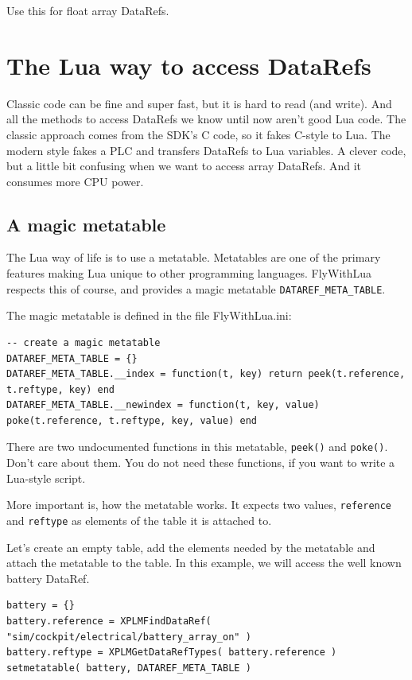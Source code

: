 \documentclass[11pt,parskip=half,a4paper]{scrartcl}
\begin{document}
Use this for float array DataRefs.


\section{The Lua way to access DataRefs}

Classic code can be fine and super fast, but it is hard to read (and write). And all the methods to access DataRefs we know until now aren't good Lua code. The classic approach comes from the SDK's C code, so it fakes C-style to Lua. The modern style fakes a PLC and transfers DataRefs to Lua variables. A clever code, but a little bit confusing when we want to access array DataRefs. And it consumes more CPU power.

\subsection{A magic metatable}

The Lua way of life is to use a metatable. Metatables are one of the primary features making Lua unique to other programming languages. FlyWithLua respects this of course, and provides a magic metatable \verb|DATAREF_META_TABLE|.

The magic metatable is defined in the file FlyWithLua.ini:

\begin{lstlisting}[firstnumber=42]
-- create a magic metatable
DATAREF_META_TABLE = {}
DATAREF_META_TABLE.__index = function(t, key) return peek(t.reference, t.reftype, key) end
DATAREF_META_TABLE.__newindex = function(t, key, value) poke(t.reference, t.reftype, key, value) end
\end{lstlisting}

There are two undocumented functions in this metatable, \verb|peek()| and \verb|poke()|. Don't care about them. You do not need these functions, if you want to write a Lua-style script.

More important is, how the metatable works. It expects two values, \verb|reference| and \verb|reftype| as elements of the table it is attached to.

Let's create an empty table, add the elements needed by the metatable and attach the metatable to the table. In this example, we will access the well known battery DataRef.

\begin{lstlisting}
battery = {}
battery.reference = XPLMFindDataRef( "sim/cockpit/electrical/battery_array_on" )
battery.reftype = XPLMGetDataRefTypes( battery.reference )
setmetatable( battery, DATAREF_META_TABLE )
\end{lstlisting}
\end{document}
